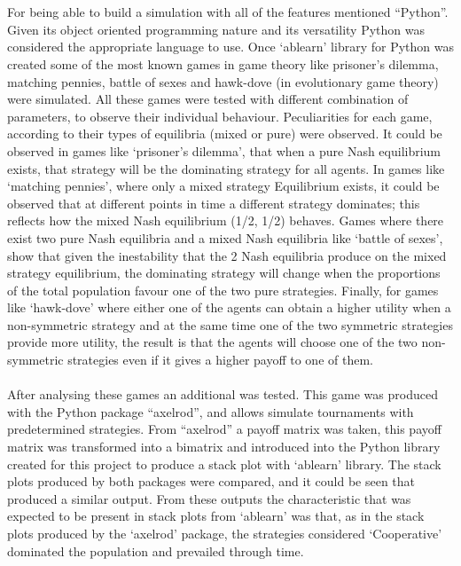 \\\\For being able to build a simulation with all of the features mentioned ``Python''. Given its object oriented programming nature and its versatility Python was considered the appropriate language to use. Once `ablearn' library for Python was created some of the most known games in game theory like prisoner's dilemma, matching pennies, battle of sexes and hawk-dove (in evolutionary game theory) were simulated. All these games were tested with different combination of parameters, to observe their individual behaviour. Peculiarities for each game, according to their types of equilibria (mixed or pure) were observed. It could be observed in games like `prisoner's dilemma', that when a pure Nash equilibrium exists, that strategy will be the dominating strategy for all agents. In games like `matching pennies', where only a mixed strategy Equilibrium exists, it could be observed that at different points in time a different strategy dominates; this reflects how the mixed Nash equilibrium (1/2, 1/2) behaves. Games where there exist two pure Nash equilibria and a mixed Nash equilibria like `battle of sexes', show that given the inestability that the 2 Nash equilibria produce on the mixed strategy equilibrium, the dominating strategy will change when the proportions of the total population favour one of the two pure strategies. Finally, for games like `hawk-dove' where either one of the agents can obtain a higher utility when a non-symmetric strategy and at the same time one of the two symmetric strategies provide more utility, the result is that the agents will choose one of the two non-symmetric strategies even if it gives a higher payoff to one of them. 
\\\\After analysing these games an additional was tested. This game was produced with the Python package ``axelrod'', and allows simulate tournaments with predetermined strategies. From ``axelrod'' a payoff matrix was taken, this payoff matrix was transformed into a bimatrix and introduced into the Python library created for this project to produce a stack plot with `ablearn' library. The stack plots produced by both packages were compared, and it could be seen that produced a similar output. From these outputs the characteristic that was expected to be present in stack plots from `ablearn' was that, as in the stack plots produced by the `axelrod' package, the strategies considered `Cooperative' dominated the population and prevailed through time.